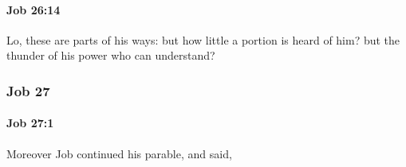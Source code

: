 		\paragraph{Job 26:14} %
			\label{JOB-26-14}

			Lo, these are parts of his ways: but how little a portion is heard of him? but the thunder of his power who can understand?

	\subsubsection{Job 27} %
		\label{JOB-27}

		\paragraph{Job 27:1} %
			\label{JOB-27-1}

			Moreover Job continued his parable, and said,

